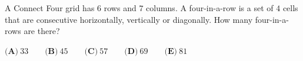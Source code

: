 A Connect Four grid has $6$ rows and $7$ columns. A four-in-a-row is a set of $4$ cells that are consecutive horizontally, vertically or diagonally. How many four-in-a-rows are there?

$\textbf{(A)}\ 33\qquad\textbf{(B)}\ 45\qquad\textbf{(C)}\ 57\qquad\textbf{(D)}\ 69\qquad\textbf{(E)}\ 81$
